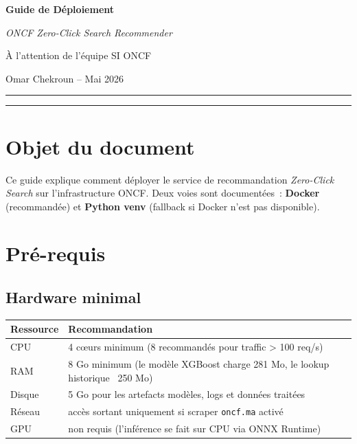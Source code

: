 \documentclass[11pt, a4paper]{article}
\begin{document}
\begin{center}
  {\Large\bfseries\color{oncfBlue}
   Guide de Déploiement\par}
  \vspace{2pt}
  {\large\color{oncfOrange}\textit{ONCF Zero-Click Search Recommender}\par}
  \vspace{8pt}
  {\large À l'attention de l'équipe SI ONCF\par}
  \vspace{4pt}
  {\small Omar Chekroun -- Mai 2026}
\end{center}

\vspace{4pt}
\hrule
\vspace{15pt}

\tableofcontents
\vspace{15pt}
\hrule
\vspace{15pt}

\section*{Objet du document}

Ce guide explique comment déployer le service de recommandation
\textit{Zero-Click Search} sur l'infrastructure ONCF. Deux voies sont
documentées~: \textbf{Docker} (recommandée) et \textbf{Python venv}
(fallback si Docker n'est pas disponible).


\section{Pré-requis}

\subsection{Hardware minimal}

\begin{tabularx}{\linewidth}{@{}lX@{}}
\toprule
\textbf{Ressource} & \textbf{Recommandation} \\
\midrule
CPU & 4 cœurs minimum (8 recommandés pour traffic > 100 req/s) \\
RAM & 8 Go minimum (le modèle XGBoost charge 281 Mo, le lookup historique ~250 Mo) \\
Disque & 5 Go pour les artefacts modèles, logs et données traitées \\
Réseau & accès sortant uniquement si scraper \texttt{oncf.ma} activé \\
GPU & non requis (l'inférence se fait sur CPU via ONNX Runtime) \\
\bottomrule
\end{tabularx}
\end{document}
